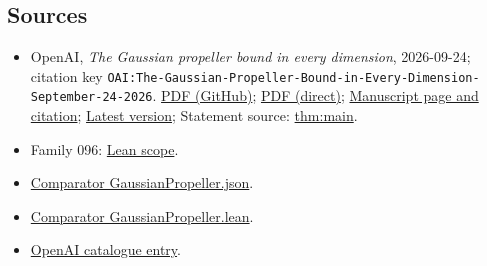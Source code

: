 \documentclass[11pt]{article}
\begin{document}
\subsection{Sources}
\begin{itemize}
\item OpenAI, \emph{The Gaussian propeller bound in every dimension}, 2026-09-24; citation key \texttt{OAI:The-Gaussian-Propeller-Bound-in-Every-Dimension-September-24-2026}. \href{https://github.com/openai/math/blob/adc7f1241b42e322a6451854ab7e4b4c146bf78a/preprints/The-Gaussian-Propeller-Bound-in-Every-Dimension-September-24-2026/main.pdf}{PDF (GitHub)}; \href{https://github.com/openai/math/raw/adc7f1241b42e322a6451854ab7e4b4c146bf78a/preprints/The-Gaussian-Propeller-Bound-in-Every-Dimension-September-24-2026/main.pdf}{PDF (direct)}; \href{https://github.com/openai/math/blob/adc7f1241b42e322a6451854ab7e4b4c146bf78a/preprints/The-Gaussian-Propeller-Bound-in-Every-Dimension-September-24-2026/README.md}{Manuscript page and citation}; \href{https://github.com/openai/math/blob/main/preprints/The-Gaussian-Propeller-Bound-in-Every-Dimension-September-24-2026/main.pdf}{Latest version}; Statement source: \href{https://github.com/openai/math/blob/adc7f1241b42e322a6451854ab7e4b4c146bf78a/preprints/The-Gaussian-Propeller-Bound-in-Every-Dimension-September-24-2026/build/main.tex\#L81}{thm:main}.
\item Family 096: \href{https://github.com/openai/math/blob/adc7f1241b42e322a6451854ab7e4b4c146bf78a/lean/docs/096.md}{Lean scope}.
\item \href{https://github.com/openai/math/blob/adc7f1241b42e322a6451854ab7e4b4c146bf78a/lean/ComparatorChallenges/GaussianPropeller.json}{Comparator GaussianPropeller.json}.
\item \href{https://github.com/openai/math/blob/adc7f1241b42e322a6451854ab7e4b4c146bf78a/lean/ComparatorChallenges/GaussianPropeller.lean}{Comparator GaussianPropeller.lean}.
\item \href{https://github.com/openai/math/blob/adc7f1241b42e322a6451854ab7e4b4c146bf78a/CONTENTS.md}{OpenAI catalogue entry}.
\end{itemize}
\end{document}
